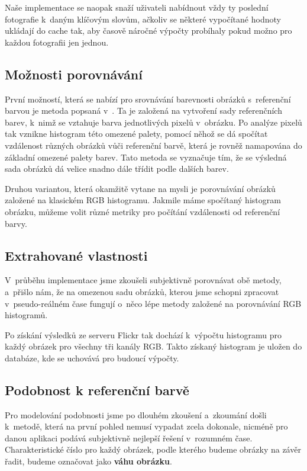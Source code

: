 \documentclass[12pt,oneside,a4paper]{article}
\begin{document}
Naše implementace se naopak snaží uživateli nabídnout vždy ty poslední fotografie k~daným klíčovým slovům, ačkoliv se některé vypočítané hodnoty ukládají do cache tak, aby časově náročné výpočty probíhaly pokud možno pro každou fotografii jen jednou.

\subsection{Možnosti porovnávání}
První možností, která se nabízí pro srovnávání barevnosti obrázků s~referenční barvou je metoda popsaná v~\cite{Mueller2k9}. Ta je založená na vytvoření sady referenčních barev, k~nimž se vztahuje barva jednotlivých pixelů v~obrázku. Po analýze pixelů tak vznikne histogram této omezené palety, pomocí něhož se dá spočítat vzdálenost různých obrázků vůči referenční barvě, která je rovněž namapována do základní omezené palety barev. Tato metoda se vyznačuje tím, že se výsledná sada obrázků dá velice snadno dále třídit podle dalších barev.

Druhou variantou, která okamžitě vytane na mysli je porovnávání obrázků založené na klasickém RGB histogramu. Jakmile máme spočítaný histogram obrázku, můžeme volit různé metriky pro počítání vzdálenosti od referenční barvy.

\subsection{Extrahované vlastnosti}

V~průběhu implementace jsme zkoušeli subjektivně porovnávat obě metody, a~přišlo nám, že na omezenou sadu obrázků, kterou jsme schopni zpracovat v~pseudo-reálném čase fungují o~něco lépe metody založené na porovnávání RGB histogramů.

Po získání výsledků ze serveru Flickr tak dochází k~výpočtu histogramu pro každý obrázek pro všechny tři kanály RGB. Takto získaný histogram je uložen do databáze, kde se uchovává pro budoucí výpočty.

\subsection{Podobnost k referenční barvě}

Pro modelování podobnosti jsme po dlouhém zkoušení a~zkoumání došli k~metodě, která na první pohled nemusí vypadat zcela dokonale, nicméně pro danou aplikaci podává subjektivně nejlepší řešení v~rozumném čase. Charakteristické číslo pro každý obrázek, podle kterého budeme obrázky na závěr řadit, budeme označovat jako \textbf{váhu obrázku}.
\end{document}
